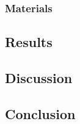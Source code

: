     \subsubsection{Materials}
    
        
    
    \subsection{Results}
    
    \subsection{Discussion}
    
    \subsection{Conclusion}
    
    
    
    
    